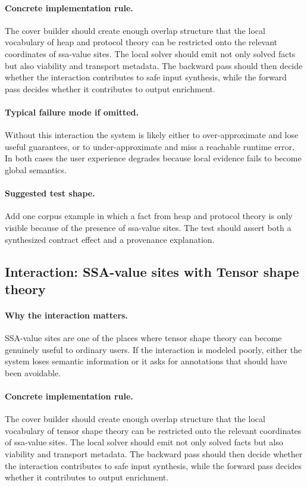 \documentclass[11pt]{report}
\theoremstyle{definition}
\theoremstyle{plain}
\begin{document}
\paragraph{Concrete implementation rule.}
The cover builder should create enough overlap structure that the local
vocabulary of heap and protocol theory can be restricted onto the relevant
coordinates of ssa-value sites. The local solver should emit not only
solved facts but also viability and transport metadata. The backward pass
should then decide whether the interaction contributes to safe input
synthesis, while the forward pass decides whether it contributes to output
enrichment.

\paragraph{Typical failure mode if omitted.}
Without this interaction the system is likely either to over-approximate and
lose useful guarantees, or to under-approximate and miss a reachable runtime
error. In both cases the user experience degrades because local evidence
fails to become global semantics.

\paragraph{Suggested test shape.}
Add one corpus example in which a fact from heap and protocol theory is only
visible because of the presence of ssa-value sites. The test should
assert both a synthesized contract effect and a provenance explanation.

\subsection{Interaction: SSA-value sites with Tensor shape theory}

\paragraph{Why the interaction matters.}
SSA-value sites are one of the places where tensor shape theory can become
genuinely useful to ordinary users. If the interaction is modeled poorly,
either the system loses semantic information or it asks for annotations that
should have been avoidable.

\paragraph{Concrete implementation rule.}
The cover builder should create enough overlap structure that the local
vocabulary of tensor shape theory can be restricted onto the relevant
coordinates of ssa-value sites. The local solver should emit not only
solved facts but also viability and transport metadata. The backward pass
should then decide whether the interaction contributes to safe input
synthesis, while the forward pass decides whether it contributes to output
enrichment.
\end{document}
